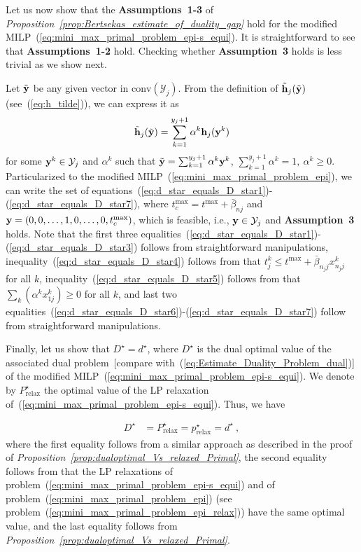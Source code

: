 \documentclass[journal, 10pt, twocolumn]{IEEEtran}
\newcommand{\be}{\begin{equation}}
\newcommand{\ee}{\end{equation}}
\newcommand{\conv}{{\mbox{conv}}}
\renewcommand{\vec}[1]{\bf{#1}}     \newcommand{\vecsc}[1]{\mbox {\boldmath \scriptsize $#1$}}     \newcommand{\itvec}[1]{\mbox {\boldmath $#1$}}
\begin{document}
Let us now show that the \textbf{Assumptions~1-3} of \emph{Proposition~\ref{prop:Bertsekas_estimate_of_duality_gap}} hold for the modified MILP~(\ref{eq:mini_max_primal_problem_epi-s_equi}). It is straightforward to see that \textbf{Assumptions~1-2} hold. Checking whether \textbf{Assumption~3} holds is less trivial as we show next.

Let $\tilde{{\vec y}}$ be any given vector in $\conv{(\mathcal{Y}_j)}$. From the definition of $\tilde{\vec h}_j(\tilde{\vec y})$ (see~(\ref{eq:h_tilde})), we can express it as
\be
\tilde{\vec h}_j(\tilde{\vec y})= \sum_{k=1}^{y_j+1}\alpha^k{\vec h}_j({\vec y}^k)
\ee
for some ${\vec y}^k\in\mathcal{Y}_j$ and $\alpha^k$ such that $\tilde{\vec y}=\sum_{k=1}^{y_j+1}\alpha^k{\vec y}^k$, $\sum_{k=1}^{y_j+1}\alpha^k=1, \ \alpha^k\geq 0$. Particularized to the modified MILP~(\ref{eq:mini_max_primal_problem_epi}), we can write the set of equations~(\ref{eq:d_star_equals_D_star1})-(\ref{eq:d_star_equals_D_star7}),
where $t^{\mathrm{max}}_c = t^{\mathrm{max}}+\bar{\beta}_{nj}$ and ${\vec y}= (0,0,\ldots,1,0,\ldots,0,t^{\mathrm{max}}_c)$, which is feasible, i.e.,  ${\vec y}\in\mathcal{Y}_j$ and \textbf{Assumption~3} holds. Note that the first three equalities~(\ref{eq:d_star_equals_D_star1})-(\ref{eq:d_star_equals_D_star3}) follows from straightforward manipulations,  inequality~(\ref{eq:d_star_equals_D_star4}) follows from that $t^k_j\leq t^{\mathrm{max}}+\bar{\beta}_{n_jj}{x^k_{n_jj}}$ for all $k$, inequality~(\ref{eq:d_star_equals_D_star5}) follows from that $\mathop{\textstyle{\sum}}_{k}(\alpha^k x^k_{1j})\geq 0$ for all $k$, and last two equalities~(\ref{eq:d_star_equals_D_star6})-(\ref{eq:d_star_equals_D_star7}) follow from straightforward manipulations.


Finally, let us show that $D^\star=d^\star$, where $D^\star$ is the dual optimal value of the associated dual problem~[compare with~(\ref{eq:Estimate_Duality_Problem_dual})] of the modified MILP~(\ref{eq:mini_max_primal_problem_epi-s_equi}). We denote by $P^\star_{\mathrm{relax}}$ the optimal value of the LP relaxation of~(\ref{eq:mini_max_primal_problem_epi-s_equi}). Thus, we have \addtocounter{equation}{1}
\begin{equation}\label{eq:d_star_equals_D_star}
\begin{split}
D^\star & = P^\star_{\mathrm{relax}}= p^\star_{\mathrm{relax}}=d^\star \ ,
\end{split}
\end{equation}
where the first equality follows from a similar approach as described in the proof of \emph{Proposition~\ref{prop:dualoptimal_Vs_relaxed_Primal}}, the second equality follows from that the LP relaxations of problem~(\ref{eq:mini_max_primal_problem_epi-s_equi}) and of problem~(\ref{eq:mini_max_primal_problem_epi}) (see problem~(\ref{eq:mini_max_primal_problem_epi_relax})) have the same optimal value, and the last equality follows from \emph{Proposition~\ref{prop:dualoptimal_Vs_relaxed_Primal}}.
\end{document}
